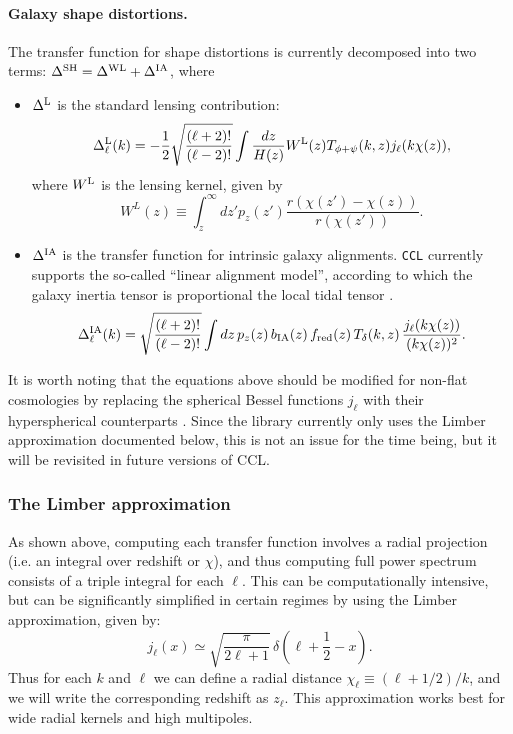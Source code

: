 \documentclass[\docopts]{\docclass}
\begin{document}
\paragraph{\bf Galaxy shape distortions.} The transfer function for shape distortions is currently decomposed into two terms: $\Delta^{\rm SH}=\Delta^{\rm WL}+\Delta^{\rm IA}$, where
\begin{itemize}
  \item $\Delta^{\rm L}$ is the standard lensing contribution:
        \begin{equation}
          \Delta_\ell^{\rm L}(k)=-\frac{1}{2}\sqrt{\frac{(\ell+2)!}{(\ell-2)!}}\int \frac{dz}{H(z)} W^{\rm L}(z) T_{\phi+\psi}(k,z) j_\ell(k\chi(z)),
        \end{equation}
        where $W^{\rm L}$ is the lensing kernel, given by
        \begin{equation}
          W^L(z)\equiv\int_z^\infty dz' p_z(z')\frac{r(\chi(z')-\chi(z))}{r(\chi(z'))}.
        \end{equation}
  \item $\Delta^{\rm IA}$ is the transfer function for intrinsic galaxy alignments. {\tt CCL} currently supports the so-called ``linear alignment model'', according to which the galaxy inertia tensor is proportional the local tidal tensor \cite{2004PhRvD..70f3526H,2007MNRAS.381.1197H}.
        \begin{equation}
          \Delta_\ell^{\rm IA}(k)=\sqrt{\frac{(\ell+2)!}{(\ell-2)!}}\int dz\,p_z(z)\,b_{\rm IA}(z)\,f_{\rm red}(z)\,T_\delta(k,z)\,\frac{j_\ell(k\chi(z))}{(k\chi(z))^2}.
        \end{equation}
\end{itemize}

It is worth noting that the equations above should be modified for non-flat cosmologies by replacing the spherical Bessel functions $j_\ell$ with their hyperspherical counterparts \cite{1994ApJ...432....7K}. Since the library currently only uses the Limber approximation documented below, this is not an issue for the time being, but it will be revisited in future versions of CCL.

\subsubsection{The Limber approximation}
As shown above, computing each transfer function involves a radial projection (i.e. an integral over redshift or $\chi$), and thus computing full power spectrum consists of a triple integral for each $\ell$. This can be computationally intensive, but can be significantly simplified in certain regimes by using the Limber approximation, given by:
\begin{equation}
 j_\ell(x)\simeq\sqrt{\frac{\pi}{2\ell+1}}\,\delta\left(\ell+\frac{1}{2}-x\right).
\end{equation}
Thus for each $k$ and $\ell$ we can define a radial distance $\chi_\ell\equiv(\ell+1/2)/k$, and we will write the corresponding redshift as $z_\ell$. This approximation works best for wide radial kernels and high multipoles.
\end{document}
